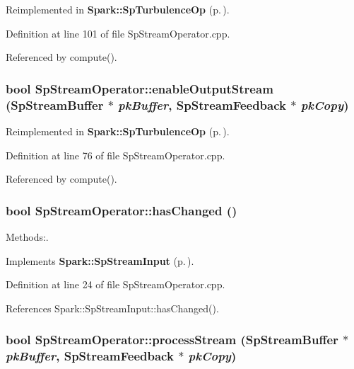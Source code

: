 Reimplemented in {\bf Spark::Sp\-Turbulence\-Op} {\rm (p.\,\pageref{classSpark_1_1SpTurbulenceOp_b5})}.

Definition at line 101 of file Sp\-Stream\-Operator.cpp.

Referenced by compute().
\subsubsection{\setlength{\rightskip}{0pt plus 5cm}bool Sp\-Stream\-Operator::enable\-Output\-Stream ({\bf Sp\-Stream\-Buffer} $\ast$ {\em pk\-Buffer}, {\bf Sp\-Stream\-Feedback} $\ast$ {\em pk\-Copy})\hspace{0.3cm}{\tt  [protected, virtual]}}\label{classSpark_1_1SpStreamOperator_b1}




Reimplemented in {\bf Spark::Sp\-Turbulence\-Op} {\rm (p.\,\pageref{classSpark_1_1SpTurbulenceOp_b0})}.

Definition at line 76 of file Sp\-Stream\-Operator.cpp.

Referenced by compute().
\subsubsection{\setlength{\rightskip}{0pt plus 5cm}bool Sp\-Stream\-Operator::has\-Changed ()\hspace{0.3cm}{\tt  [virtual]}}\label{classSpark_1_1SpStreamOperator_a3}


Methods:. 



Implements {\bf Spark::Sp\-Stream\-Input} {\rm (p.\,\pageref{classSpark_1_1SpStreamInput_a2})}.

Definition at line 24 of file Sp\-Stream\-Operator.cpp.

References Spark::Sp\-Stream\-Input::has\-Changed().
\subsubsection{\setlength{\rightskip}{0pt plus 5cm}bool Sp\-Stream\-Operator::process\-Stream ({\bf Sp\-Stream\-Buffer} $\ast$ {\em pk\-Buffer}, {\bf Sp\-Stream\-Feedback} $\ast$ {\em pk\-Copy})\hspace{0.3cm}{\tt  [protected, virtual]}}\label{classSpark_1_1SpStreamOperator_b3}




